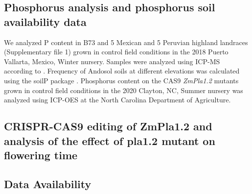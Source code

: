 \documentclass[9pt,twocolumn,twoside]{BioRxiv}
\begin{document}
\subsection{Phosphorus analysis and phosphorus soil availability data}
We analyzed P content in B73 and 5 Mexican  and 5 Peruvian highland landraces (Supplementary file 1) grown in control field conditions in the 2018 Puerto Vallarta, Mexico, Winter nursery. Samples were analyzed using ICP-MS according to \cite{Baxter2014-ch}. 
Frequency of Andosol soils at different elevations was calculated using the soilP package \cite{Rodriguez-Zapata2018-vz}.
Phosphorus content on the CAS9 \textit{ZmPla1.2} mutants grown in control field conditions in the 2020 Clayton, NC, Summer nursery was analyzed using ICP-OES at the North Carolina Department of Agriculture.   

\subsection{CRISPR-CAS9 editing of ZmPla1.2 and analysis of the effect of pla1.2 mutant on flowering time}

\subsection{Data Availability}
\end{document}
